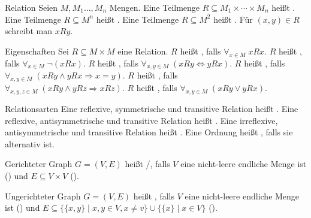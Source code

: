 \begin{Def}{Relation}
    Seien $M, M_1 \ldots, M_n$ Mengen.
    Eine Teilmenge $R \subseteq M_1 \times \cdots \times M_n$ heißt
    .
    Eine Teilmenge $R \subseteq M^n$ heißt
    .
    Eine Teilmenge $R \subseteq M^2$ heißt
    .
    Für $(x,y) \in R$ schreibt man $xRy$.
\end{Def}

\begin{Def}{Eigenschaften}
    Sei $R \subseteq M \times M$ eine Relation.
    $R$ heißt , falls $\forall_{x \in M}\; xRx$.
    $R$ heißt , falls $\forall_{x \in M}\; \lnot(xRx)$.
    $R$ heißt , falls
    $\forall_{x, y \in M}\; (xRy \Leftrightarrow yRx)$.
    $R$ heißt , falls
    $\forall_{x, y \in M}\; (xRy \land yRx \Rightarrow x = y)$.
    $R$ heißt , falls \\
    $\forall_{x, y, z \in M}\; (xRy \land yRz \Rightarrow xRz)$.
    $R$ heißt , falls
    $\forall_{x, y \in M}\; (xRy \lor yRx)$.
\end{Def}

\begin{Def}{Relationsarten}
    Eine reflexive, symmetrische und transitive Relation heißt
    .
    Eine reflexive, antisymmetrische und transitive Relation heißt
    .
    Eine irreflexive, antisymmetrische und transitive Relation heißt
    .
    Eine Ordnung heißt , falls sie alternativ
    ist.
\end{Def}

\begin{Def}{Gerichteter Graph}
    $G = (V, E)$ heißt /, falls
    $V$ eine nicht-leere endliche Menge ist () und
    $E \subseteq V \times V$ ().
\end{Def}

\begin{Def}{Ungerichteter Graph}
    $G = (V, E)$ heißt , falls
    $V$ eine nicht-leere endliche Menge ist () und
    $E \subseteq \big\{\{x, y\} \;|\; x, y \in V, x \not= v\big\} \cup
    \big\{\{x\} \;|\; x \in V\big\}$ ().
\end{Def}

